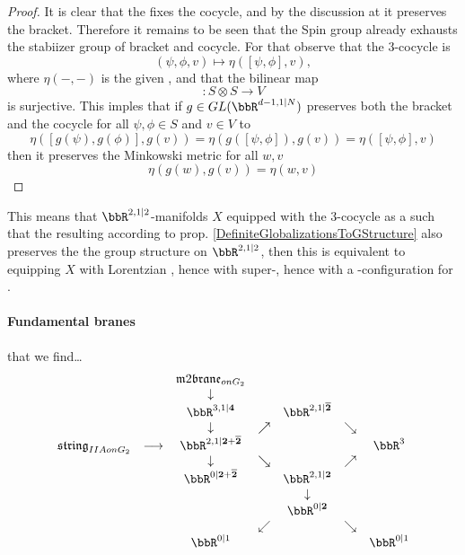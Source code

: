 \documentclass[12pt,titlepage]{article}
\newcommand{\itexarray}[1]{\begin{matrix}#1\end{matrix}}
\theoremstyle{plain}
\theoremstyle{definition}
\theoremstyle{remark}
\begin{document}
\begin{proof}
It is clear that the  fixes the cocycle, and by the discussion at  it preserves the bracket. Therefore it remains to be seen that the Spin group already exhausts the stabiizer group of bracket and cocycle. For that observe that the 3-cocycle is
\begin{displaymath}
(\psi,\phi, v) \mapsto \eta( [\psi,\phi], v )
,
\end{displaymath}
where $\eta(-,-)$ is the given , and that the bilinear map
\begin{displaymath}
[-,-]\colon S \otimes S\to V
\end{displaymath}
is surjective. This imples that if $g \in GL(\bbR^{d-1,1|N})$ preserves both the bracket and the cocycle for all $\psi, \phi \in S$ and $v \in V$ to
\begin{displaymath}
\eta( [g(\psi),g(\phi)], g(v) )
=
\eta( g([\psi,\phi]), g(v) )
=
\eta( [\psi,\phi], v )
\end{displaymath}
then it preserves the Minkowski metric for all $w,v$
\begin{displaymath}
\eta(g(w), g(v)) = \eta(w,v)
\end{displaymath}
\end{proof}
This means that $\bbR^{2,1|2}$-manifolds $X$ equipped with the 3-cocycle as a  such that the resulting  according to prop. \ref{DefiniteGlobalizationsToGStructure} also preserves the the group structure on $\bbR^{2,1|2}$, then this is equivalent to equipping $X$ with Lorentzian , hence with super-, hence with a -configuration for .
\hypertarget{fundamental_branes}{}\paragraph*{{Fundamental branes}}\label{fundamental_branes}
 that we find\ldots{}
\begin{displaymath}
\itexarray{
&& \mathfrak{m}2\mathfrak{brane}_{onG_2}
\\
&& \downarrow
\\
&& \bbR^{3,1|\mathbf{4}}  &&  \bbR^{2,1|\overline{\mathbf{2}}}
\\
&& \downarrow & \nearrow&  & \searrow
\\
\mathfrak{string}_{IIAonG_2} &\longrightarrow& \bbR^{2,1|\mathbf{2}+\overline{\mathbf{2}}} &&  && \bbR^{3}
\\
&& \downarrow &\searrow&  & \nearrow
\\
&& \bbR^{0|\mathbf{2}+\overline{\mathbf{2}}} &&  \bbR^{2,1|\mathbf{2}}
\\
&& && \downarrow
\\
&& && \bbR^{0|\mathbf{2}}
\\
&& & \swarrow && \searrow
\\
&& \bbR^{0|1} && && \bbR^{0|1}
}
\end{displaymath}
\end{document}
